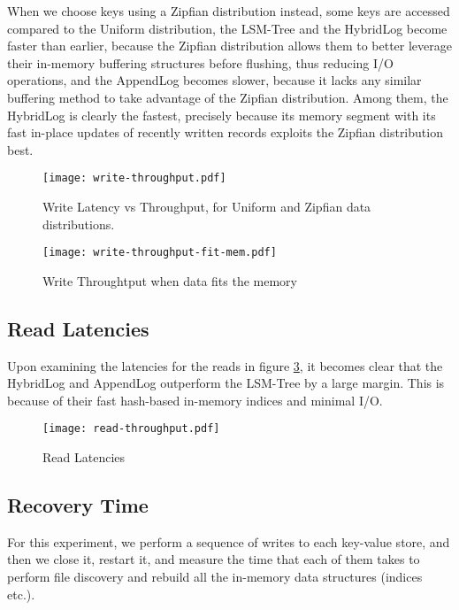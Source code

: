 When we choose keys using a Zipfian distribution instead, some keys are accessed compared to the Uniform distribution, the LSM-Tree and the HybridLog become faster than earlier, because the Zipfian distribution allows them to better leverage their in-memory buffering structures before flushing, thus reducing I/O operations, and the AppendLog becomes slower, because it lacks any similar buffering method to take advantage of the Zipfian distribution. Among them, the HybridLog is clearly the fastest, precisely because its memory segment with its fast in-place updates of recently written records exploits the Zipfian distribution best.


\begin{figure}[h]
    \centering
    \texttt{[image: write-throughput.pdf]}
    \caption{Write Latency vs Throughput, for Uniform and Zipfian data distributions.}
    \label{fig:comparison-write}
\end{figure}

\begin{figure}[h]
    \centering
    \texttt{[image: write-throughput-fit-mem.pdf]}
    \caption{Write Throughtput when data fits the memory}
    \label{fig:comparison-write-fit-mem}
\end{figure}

\subsection{Read Latencies}

Upon examining the latencies for the reads in figure \ref{fig:comparison-read-latencies}, it becomes clear that the HybridLog and AppendLog outperform the LSM-Tree by a large margin. This is because of their fast hash-based in-memory indices and minimal I/O.

\begin{figure}[h]
    \centering
    \texttt{[image: read-throughput.pdf]}
    \caption{Read Latencies}
    \label{fig:comparison-read-latencies}
\end{figure}

\subsection{Recovery Time}

For this experiment, we perform a sequence of writes to each key-value store, and then we close it, restart it, and measure the time that each of them takes to perform file discovery and rebuild all the in-memory data structures (indices etc.).

